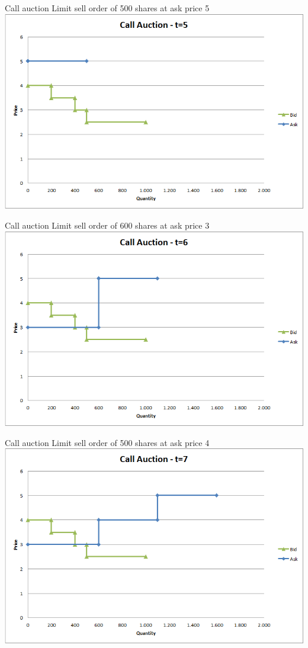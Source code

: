 \documentclass[english,10pt]{beamer}
\theoremstyle{definition}
\begin{document}
\begin{frame}{Call auction}
	Limit sell order of 500 shares at ask price 5
	\quad
	\center
	\includegraphics[width=.75\linewidth]{pics/Call_t5}
\end{frame}


\begin{frame}{Call auction}
	Limit sell order of 600 shares at ask price 3
	\quad
	\center
	\includegraphics[width=.75\linewidth]{pics/Call_t6}
\end{frame}


\begin{frame}{Call auction}
	Limit sell order of 500 shares at ask price 4
	\quad
	\center
	\includegraphics[width=.75\linewidth]{pics/Call_t7}
\end{frame}
\end{document}
